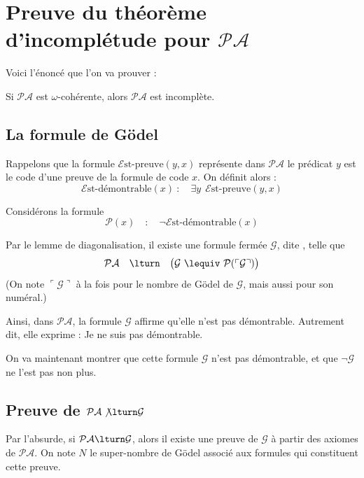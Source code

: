 \documentclass[11pt,class=report,crop=false]{standalone}
\begin{document}
\section{Preuve du théorème d'incomplétude pour $\mathcal{PA}$}

Voici l'énoncé que l'on va prouver :

\begin{theoreme}
    Si $\mathcal{PA}$ est $\omega$-cohérente, alors $\mathcal{PA}$ est incomplète.
\end{theoreme}


\subsection{La formule de Gödel}

Rappelons que la formule $\mathcal{E}\text{st-preuve}(y,x)$
représente dans $\mathcal{PA}$ le prédicat \og{}$y$ est le code d'une preuve de la formule de code $x$\fg{}. On définit alors :
\[
\mathcal{E}\text{st-démontrable}(x)
\ : \quad
\exists y \ \ \mathcal{E}\text{st-preuve}(y,x)
\]

Considérons la formule
\[
\mathcal{P}(x) \quad : \quad
\lnot\mathcal{E}\text{st-démontrable}(x)
\]

Par le lemme de diagonalisation, il existe une formule fermée $\mathcal{G}$, dite , telle que
\[ \mathcal{PA} \quad \lturn \quad \big( \mathcal{G} \ \lequiv \  \mathcal{P}(\ulcorner \mathcal{G} \urcorner) \big) \]
%
(On note $\ulcorner \mathcal{G} \urcorner$ à la fois pour le nombre de Gödel de $\mathcal{G}$, mais aussi pour son numéral.)

Ainsi, dans $\mathcal{PA}$, la formule $\mathcal{G}$ affirme qu'elle n'est pas démontrable. Autrement dit, elle exprime :
\og{}Je ne suis pas démontrable.\fg{}

On va maintenant montrer que cette formule $\mathcal{G}$ n'est pas démontrable, et que $\lnot \mathcal{G}$ ne l'est pas non plus.


\subsection{Preuve de $\mathcal{PA} \not\lturn \mathcal{G}$}

Par l'absurde, si $\mathcal{PA} \lturn \mathcal{G}$, alors il existe une preuve de $\mathcal{G}$ à partir des axiomes de $\mathcal{PA}$. On note $N$ le super-nombre de Gödel associé aux formules qui constituent cette preuve.
\end{document}
